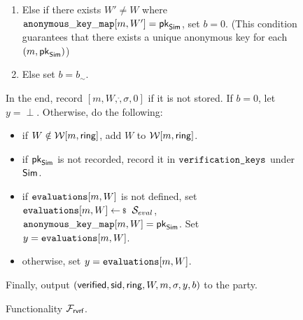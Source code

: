 \begin{figure}
\begin{tcolorbox}[left=2pt,right=2pt]
{\begin{list}{\hspace*{1pt} C}{\setlength\leftmargin{0.15in}}
\begin{enumerate}
					\item Else if there exists $ W' \neq W $ where  $ \mathtt{anonymous\_key\_map}[m,W'] = \mathsf{pk}_{\mathsf{Sim}} $, set $ b = 0 $. \label{cond:differentWforsamepk} (This condition guarantees that there exists a unique anonymous key for each $ (m, \mathsf{pk}_{\mathsf{Sim}}) $)
					\item Else set $ b = b_\sim$. \label{cond:simulatorbit}
				\end{enumerate}		

			\end{list}
			In the end,  record $ [m,W,\ring,\sigma, 0] $ if it is not stored. If $ b = 0 $, let $y = \perp $. Otherwise,   do the following:
			\begin{itemize}
				\item if $ W \notin \mathcal{W}[m,\mathsf{ring}] $, add $ W $ to $ \mathcal{W}[m,\mathsf{ring}]  $.
				\item if $ \mathsf{pk}_{\mathsf{Sim}} $ is not recorded, record it in $ \texttt{verification\_keys} $ under $ \mathsf{Sim} $.
				\item if $ \texttt{evaluations}[m,W] $ is not defined, set $ \evaluationslist[m, W]\leftsample \setsym{S}_{eval}$, $ \mathtt{anonymous\_key\_map}[m,W]  = \mathsf{pk}_{\mathsf{Sim}}$.  Set $ y= \texttt{evaluations}[m, W]$.
				\item otherwise, set $ y = \texttt{evaluations}[m, W]$. 	
			\end{itemize}
			Finally, output $(\mathsf{verified}, \textsf{sid}, \mathsf{ring},W, m, \sigma, y, b)$ to the party.
			
	

	}
\end{tcolorbox}
\caption{Functionality $\mathcal{F}_{\textsf{rvrf}}$.\label{f:gvrf}}
\end{figure}



